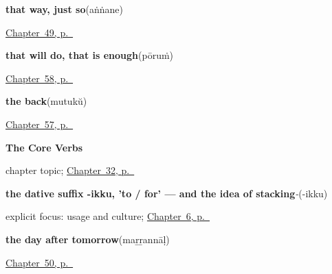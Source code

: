 \noindent\begin{minipage}[t]{\linewidth}
\raggedright
\textbf{that way, just so}\enspace\emph{}\enspace(aṅṅane)\par
\footnotesize \hyperref[ch:ml-replies]{Chapter~49, p.~\pageref*{ch:ml-replies}}
\end{minipage}\par\smallskip

\noindent\begin{minipage}[t]{\linewidth}
\raggedright
\textbf{that will do, that is enough}\enspace\emph{}\enspace(pōruṁ)\par
\footnotesize \hyperref[ch:ml-five-more-short-answers]{Chapter~58, p.~\pageref*{ch:ml-five-more-short-answers}}
\end{minipage}\par\smallskip

\noindent\begin{minipage}[t]{\linewidth}
\raggedright
\textbf{the back}\enspace\emph{}\enspace(mutukŭ)\par
\footnotesize \hyperref[ch:ml-five-more-of-the-body]{Chapter~57, p.~\pageref*{ch:ml-five-more-of-the-body}}
\end{minipage}\par\smallskip

\noindent\begin{minipage}[t]{\linewidth}
\raggedright
\textbf{The Core Verbs}\par
\footnotesize chapter topic; \hyperref[ch:ml-core-verbs]{Chapter~32, p.~\pageref*{ch:ml-core-verbs}}
\end{minipage}\par\smallskip

\noindent\begin{minipage}[t]{\linewidth}
\raggedright
\textbf{the dative suffix -ikku, 'to / for' — and the idea of stacking}\enspace\emph{-}\enspace(-ikku)\par
\footnotesize explicit focus: usage and culture; \hyperref[ch:ml-dative-case]{Chapter~6, p.~\pageref*{ch:ml-dative-case}}
\end{minipage}\par\smallskip

\noindent\begin{minipage}[t]{\linewidth}
\raggedright
\textbf{the day after tomorrow}\enspace\emph{}\enspace(maṟṟannāḷ)\par
\footnotesize \hyperref[ch:ml-taking-leave]{Chapter~50, p.~\pageref*{ch:ml-taking-leave}}
\end{minipage}\par\smallskip

